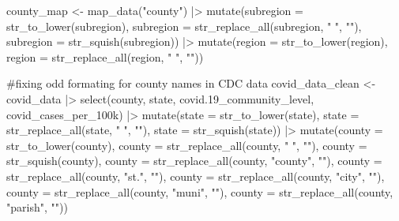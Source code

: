 \documentclass[
  letterpaper,
  DIV=11,
  numbers=noendperiod]{scrartcl}
\newenvironment{Shaded}{\begin{snugshade}}{\end{snugshade}}
\newcommand{\AttributeTok}[1]{\textcolor[rgb]{0.40,0.45,0.13}{#1}}
\newcommand{\CommentTok}[1]{\textcolor[rgb]{0.37,0.37,0.37}{#1}}
\newcommand{\FloatTok}[1]{\textcolor[rgb]{0.68,0.00,0.00}{#1}}
\newcommand{\FunctionTok}[1]{\textcolor[rgb]{0.28,0.35,0.67}{#1}}
\newcommand{\NormalTok}[1]{\textcolor[rgb]{0.00,0.23,0.31}{#1}}
\newcommand{\OtherTok}[1]{\textcolor[rgb]{0.00,0.23,0.31}{#1}}
\newcommand{\SpecialCharTok}[1]{\textcolor[rgb]{0.37,0.37,0.37}{#1}}
\newcommand{\StringTok}[1]{\textcolor[rgb]{0.13,0.47,0.30}{#1}}
\begin{document}
\begin{Shaded}
\begin{Highlighting}[]
\NormalTok{county\_map }\OtherTok{\textless{}{-}} \FunctionTok{map\_data}\NormalTok{(}\StringTok{"county"}\NormalTok{) }\SpecialCharTok{|\textgreater{}}
  \FunctionTok{mutate}\NormalTok{(}\AttributeTok{subregion =} \FunctionTok{str\_to\_lower}\NormalTok{(subregion),}
         \AttributeTok{subregion =} \FunctionTok{str\_replace\_all}\NormalTok{(subregion, }\StringTok{" "}\NormalTok{, }\StringTok{""}\NormalTok{),}
         \AttributeTok{subregion =} \FunctionTok{str\_squish}\NormalTok{(subregion)) }\SpecialCharTok{|\textgreater{}}
  \FunctionTok{mutate}\NormalTok{(}\AttributeTok{region =} \FunctionTok{str\_to\_lower}\NormalTok{(region),}
         \AttributeTok{region =} \FunctionTok{str\_replace\_all}\NormalTok{(region, }\StringTok{" "}\NormalTok{, }\StringTok{""}\NormalTok{))}

\CommentTok{\#fixing odd formating for county names in CDC data}
\NormalTok{covid\_data\_clean }\OtherTok{\textless{}{-}}\NormalTok{ covid\_data }\SpecialCharTok{|\textgreater{}}
  \FunctionTok{select}\NormalTok{(county, state, covid}\FloatTok{.19}\NormalTok{\_community\_level, covid\_cases\_per\_100k) }\SpecialCharTok{|\textgreater{}}
  \FunctionTok{mutate}\NormalTok{(}\AttributeTok{state =} \FunctionTok{str\_to\_lower}\NormalTok{(state),}
         \AttributeTok{state =} \FunctionTok{str\_replace\_all}\NormalTok{(state, }\StringTok{" "}\NormalTok{, }\StringTok{""}\NormalTok{),}
         \AttributeTok{state =} \FunctionTok{str\_squish}\NormalTok{(state)) }\SpecialCharTok{|\textgreater{}}
  \FunctionTok{mutate}\NormalTok{(}\AttributeTok{county =} \FunctionTok{str\_to\_lower}\NormalTok{(county),}
         \AttributeTok{county =} \FunctionTok{str\_replace\_all}\NormalTok{(county, }\StringTok{" "}\NormalTok{, }\StringTok{""}\NormalTok{),}
         \AttributeTok{county =} \FunctionTok{str\_squish}\NormalTok{(county),}
         \AttributeTok{county =} \FunctionTok{str\_replace\_all}\NormalTok{(county, }\StringTok{"county"}\NormalTok{, }\StringTok{""}\NormalTok{),}
         \AttributeTok{county =} \FunctionTok{str\_replace\_all}\NormalTok{(county, }\StringTok{"st."}\NormalTok{, }\StringTok{""}\NormalTok{),}
         \AttributeTok{county =} \FunctionTok{str\_replace\_all}\NormalTok{(county, }\StringTok{"city"}\NormalTok{, }\StringTok{""}\NormalTok{),}
         \AttributeTok{county =} \FunctionTok{str\_replace\_all}\NormalTok{(county, }\StringTok{"muni"}\NormalTok{, }\StringTok{""}\NormalTok{),}
         \AttributeTok{county =} \FunctionTok{str\_replace\_all}\NormalTok{(county, }\StringTok{"parish"}\NormalTok{, }\StringTok{""}\NormalTok{))}


\end{Highlighting}
\end{Shaded}
\end{document}
